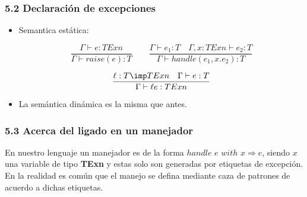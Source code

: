 \documentclass[xcolor=dvipsnames,table,spanish]{beamer}
\begin{document}
\begin{frame}
\frametitle{5.2 Declaración de excepciones}
\begin{itemize}
\item Semantica estática:

\[ \frac{\Gamma \vdash e:TExn}{\Gamma \vdash raise(e):T} \qquad \frac{\Gamma \vdash e_1:T \quad \Gamma,x:TExn \vdash e_2:T}{\Gamma \vdash handle(e_1,x.e_2):T}\]

\[ \frac{\ell:T \imp TExn \quad \Gamma \vdash e:T}{\Gamma \vdash \ell e:TExn}\]
\item La semántica dinámica es la misma que antes.
\end{itemize}
\end{frame}
\begin{frame}
\frametitle{5.3 Acerca del ligado en un manejador}
En nuestro lenguaje un manejador es de la forma $handle$ $\mathit{e}$ $with$ $\mathit{x} \Rightarrow \mathit{e}$, siendo $\mathit{x}$ una variable de tipo \textbf{TExn} y estas solo son generadas por etiquetas de excepción. En la realidad es común que el manejo se defina mediante caza de patrones de acuerdo a dichas etiquetas.
\end{frame}
\end{document}
